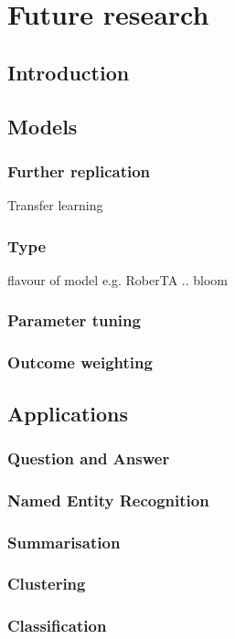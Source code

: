 \chapter{Future research }

\section{Introduction}


\section{Models}

\subsection{Further replication} Transfer learning
\subsection{Type} flavour of model e.g. RoberTA .. bloom
\subsection{Parameter tuning}
\subsection{Outcome weighting}


\section{Applications}
\subsection{Question and Answer}
\subsection{Named Entity Recognition}
\subsection{Summarisation}
\subsection{Clustering}
\subsection{Classification}
